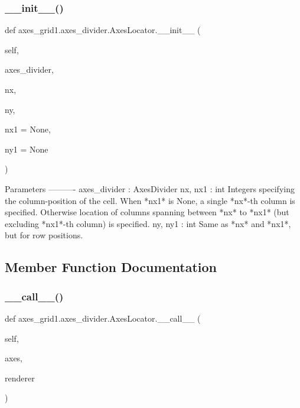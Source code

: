 \subsubsection{\texorpdfstring{\+\_\+\+\_\+init\+\_\+\+\_\+()}{\_\_init\_\_()}}
{\footnotesize\ttfamily def axes\+\_\+grid1.\+axes\+\_\+divider.\+Axes\+Locator.\+\_\+\+\_\+init\+\_\+\+\_\+ (\begin{DoxyParamCaption}\item[{}]{self,  }\item[{}]{axes\+\_\+divider,  }\item[{}]{nx,  }\item[{}]{ny,  }\item[{}]{nx1 = {\ttfamily None},  }\item[{}]{ny1 = {\ttfamily None} }\end{DoxyParamCaption})}

\begin{DoxyVerb}Parameters
----------
axes_divider : AxesDivider
nx, nx1 : int
    Integers specifying the column-position of the
    cell. When *nx1* is None, a single *nx*-th column is
    specified. Otherwise location of columns spanning between *nx*
    to *nx1* (but excluding *nx1*-th column) is specified.
ny, ny1 : int
    Same as *nx* and *nx1*, but for row positions.
\end{DoxyVerb}
 

\subsection{Member Function Documentation}
\mbox{\label{classaxes__grid1_1_1axes__divider_1_1AxesLocator_a6ba24781359fae61a2dac10a2902fa9c}} 
\subsubsection{\texorpdfstring{\+\_\+\+\_\+call\+\_\+\+\_\+()}{\_\_call\_\_()}}
{\footnotesize\ttfamily def axes\+\_\+grid1.\+axes\+\_\+divider.\+Axes\+Locator.\+\_\+\+\_\+call\+\_\+\+\_\+ (\begin{DoxyParamCaption}\item[{}]{self,  }\item[{}]{axes,  }\item[{}]{renderer }\end{DoxyParamCaption})}

